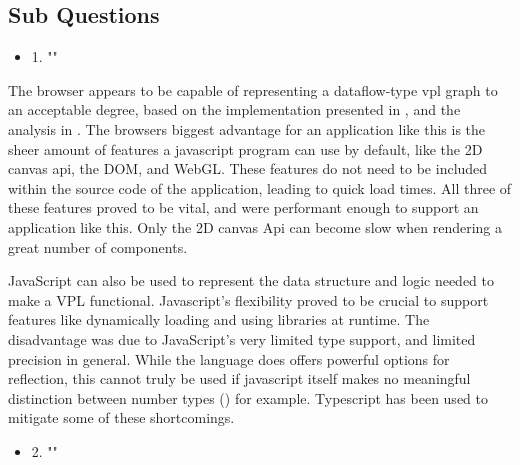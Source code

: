 \subsection*{Sub Questions}

\begin{itemize}[ ]
  \item 1. "\mySubRQOne"
\end{itemize}

The browser appears to be capable of representing a dataflow-type vpl graph to an acceptable degree, 
based on the implementation presented in , and the analysis in .
The browsers biggest advantage for an application like this is the sheer amount of features a javascript program can use by default, like the 2D canvas api, the DOM, and WebGL. 
These features do not need to be included within the source code of the application, leading to quick load times. 
All three of these features proved to be vital, and were performant enough to support an application like this. 
Only the 2D canvas Api can become slow when rendering a great number of components. 

JavaScript can also be used to represent the data structure and logic needed to make a VPL functional. 
Javascript's flexibility proved to be crucial to support features like dynamically loading and using libraries at runtime. 
The disadvantage was due to JavaScript's very limited type support, and limited precision in general. 
While the language does offers powerful options for reflection, this cannot truly be used if javascript itself makes no meaningful distinction between number types () for example. 
Typescript has been used to mitigate some of these shortcomings.  

\begin{itemize}[ ]
  \item 2. "\mySubRQTwo"
\end{itemize}


